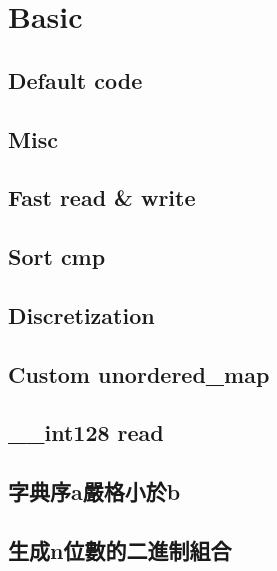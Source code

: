 \setcounter{page}{1}
\section{Basic}

\subsection{Default code}


\subsection{Misc}


\subsection{Fast read \& write}


\subsection{Sort cmp}


\subsection{Discretization}


\subsection{Custom unordered\_map}


\subsection{\_\_int128 read}


\subsection{字典序a嚴格小於b}


\subsection{生成n位數的二進制組合}


